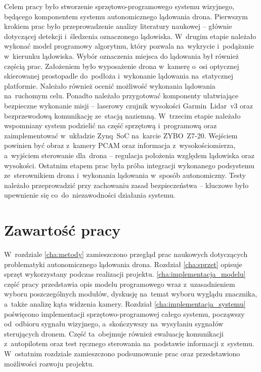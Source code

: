 Celem pracy było stworzenie sprzętowo-programowego systemu wizyjnego, będącego komponentem systemu autonomicznego lądowania drona. 
Pierwszym krokiem prac było przeprowadzenie analizy literatury naukowej -- głównie dotyczącej detekcji i~śledzenia oznaczonego lądowiska. 
W~drugim etapie należało wykonać model programowy algorytmu, który pozwala na~wykrycie i~podążanie w~kierunku  lądowiska. 
Wybór oznaczenia miejsca do lądowania był również częścią prac. 
Założeniem było wyposażenie drona w~kamerę o~osi optycznej skierowanej prostopadle do~podłoża i~wykonanie lądowania na~statycznej platformie. 
Należało również ocenić możliwość wykonania lądowania na~ruchomym celu.
Ponadto należało przygotować komponenty ułatwiające bezpieczne wykonanie misji -- laserowy czujnik wysokości Garmin~Lidar~v3 oraz bezprzewodową komunikację ze~stacją naziemną. 
W~trzecim etapie należało wspomniany system podzielić na część sprzętową i~programową oraz zaimplementować w~układzie Zynq~SoC na~karcie ZYBO~Z7-20. 
Wejściem powinien być obraz z~kamery PCAM oraz informacja z~wysokościomierza, a~wyjściem sterowanie dla~drona -- regulacja położenia względem lądowiska oraz wysokości.
Ostatnim etapem prac była próba integracji wykonanego podsystemu ze~sterownikiem drona i~wykonania lądowania w~sposób autonomiczny. 
Testy należało przeprowadzić przy zachowaniu zasad bezpieczeństwa -- kluczowe było upewnienie się co~do~niezawodności działania systemu.



\section{Zawartość pracy}
\label{sec:zawartoscPracy}

W~rozdziale \ref{cha:metody} zamieszczono przegląd prac naukowych dotyczących problematyki autonomicznego lądowania drona. 
Rozdział \ref{cha:sprzet} opisuje sprzęt wykorzystany podczas realizacji projektu. 
\ref{cha:implementacja_modelu} część pracy przedstawia opis modelu programowego wraz z~uzasadnieniem wyboru poszczególnych modułów, dyskusję na~temat wyboru wyglądu znacznika, a~także analizę kąta widzenia kamery. 
Rozdział \ref{cha:implementacja_systemu} poświęcono implementacji sprzętowo-programowej całego systemu, począwszy od~odbioru sygnału wizyjnego, a~skończywszy na~wysyłaniu sygnałów sterujących dronem. Część ta~obejmuje również ewaluację komunikacji z~autopilotem oraz test ręcznego sterowania na~podstawie informacji z~systemu. 
W~ostatnim rozdziale zamieszczono podsumowanie prac oraz przedstawiono możliwości rozwoju projektu.

